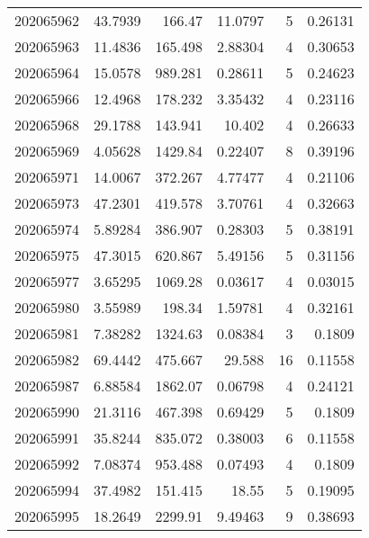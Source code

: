 \begin{tabular}{rrrrrr}
 202065962 &         43.7939  &      166.47   &           11.0797  &           5 & 0.26131 \\
 202065963 &         11.4836  &      165.498  &            2.88304 &           4 & 0.30653 \\
 202065964 &         15.0578  &      989.281  &            0.28611 &           5 & 0.24623 \\
 202065966 &         12.4968  &      178.232  &            3.35432 &           4 & 0.23116 \\
 202065968 &         29.1788  &      143.941  &           10.402   &           4 & 0.26633 \\
 202065969 &          4.05628 &     1429.84   &            0.22407 &           8 & 0.39196 \\
 202065971 &         14.0067  &      372.267  &            4.77477 &           4 & 0.21106 \\
 202065973 &         47.2301  &      419.578  &            3.70761 &           4 & 0.32663 \\
 202065974 &          5.89284 &      386.907  &            0.28303 &           5 & 0.38191 \\
 202065975 &         47.3015  &      620.867  &            5.49156 &           5 & 0.31156 \\
 202065977 &          3.65295 &     1069.28   &            0.03617 &           4 & 0.03015 \\
 202065980 &          3.55989 &      198.34   &            1.59781 &           4 & 0.32161 \\
 202065981 &          7.38282 &     1324.63   &            0.08384 &           3 & 0.1809  \\
 202065982 &         69.4442  &      475.667  &           29.588   &          16 & 0.11558 \\
 202065987 &          6.88584 &     1862.07   &            0.06798 &           4 & 0.24121 \\
 202065990 &         21.3116  &      467.398  &            0.69429 &           5 & 0.1809  \\
 202065991 &         35.8244  &      835.072  &            0.38003 &           6 & 0.11558 \\
 202065992 &          7.08374 &      953.488  &            0.07493 &           4 & 0.1809  \\
 202065994 &         37.4982  &      151.415  &           18.55    &           5 & 0.19095 \\
 202065995 &         18.2649  &     2299.91   &            9.49463 &           9 & 0.38693 \\

\end{tabular}
